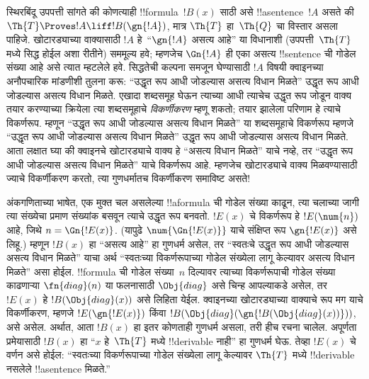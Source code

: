\documentclass[../../../include/open-logic-section]{subfiles}
\begin{document}


\begin{explain}
स्थिरबिंदू उपपत्ती सांगते की कोणत्याही
!!{formula}~$!B(x)$ साठी असे !!a{sentence}~$!A$ असते की
$\Th{T} \Proves !A \liff !B(\gn{!A})$, मात्र
$\Th{T}$ हा~$\Th{Q}$ चा विस्तार असला पाहिजे.
खोटारड्याच्या वाक्यासाठी $!A$ हे~“$\gn{!A}$ असत्य आहे”
या विधानाशी (उपपत्ती~$\Th{T}$ मध्ये सिद्ध होईल अशा
रीतीने) सममूल्य हवे; म्हणजेच $\Gn{!A}$ ही एका असत्य
!!{sentence} ची गोडेल संख्या आहे असे त्यात म्हटलेले हवे.
सिद्धतेची कल्पना समजून घेण्यासाठी $!A$ विषयी क्वाइनच्या
अनौपचारिक मांडणीशी तुलना करू: “उद्धृत रूप आधी जोडल्यास
असत्य विधान मिळते” उद्धृत रूप आधी जोडल्यास असत्य विधान
मिळते. एखादा शब्दसमूह घेऊन त्याच्या आधी त्याचेच उद्धृत
रूप जोडून वाक्य तयार करण्याच्या क्रियेला त्या शब्दसमूहाचे
\emph{विकर्णीकरण} म्हणू शकतो; तयार झालेला परिणाम हे
त्याचे विकर्णरूप. म्हणून “उद्धृत रूप आधी जोडल्यास असत्य
विधान मिळते” या शब्दसमूहाचे विकर्णरूप म्हणजे “उद्धृत रूप
आधी जोडल्यास असत्य विधान मिळते” उद्धृत रूप आधी
जोडल्यास असत्य विधान मिळते. आता लक्षात घ्या की क्वाइनचे
खोटारड्याचे वाक्य हे “असत्य विधान मिळते” याचे नव्हे,
तर “उद्धृत रूप आधी जोडल्यास असत्य विधान मिळते” याचे
विकर्णरूप आहे. म्हणजेच खोटारड्याचे वाक्य मिळवण्यासाठी
ज्याचे विकर्णीकरण करतो, त्या गुणधर्मातच विकर्णीकरण
समाविष्ट असते!{}

अंकगणिताच्या भाषेत, एक मुक्त चल असलेल्या
!!a{formula} ची गोडेल संख्या काढून, त्या चलाच्या जागी
त्या संख्येचा प्रमाण संख्यांक बसवून त्याचे उद्धृत रूप
बनवतो. $!E(x)$ चे विकर्णरूप हे $!E(\num{n})$ आहे,
जिथे $n = \Gn{!E(x)}$. (यापुढे
$\num{\Gn{!E(x)}}$ याचे संक्षिप्त रूप
$\gn{!E(x)}$ असे लिहू.) म्हणून $!B(x)$ हा
“असत्य आहे” हा गुणधर्म असेल, तर “स्वतःचे उद्धृत रूप
आधी जोडल्यास असत्य विधान मिळते” याचा अर्थ
“स्वतःच्या विकर्णरूपाच्या गोडेल संख्येला लागू केल्यावर
असत्य विधान मिळते” असा होईल. !!{formula} ची गोडेल
संख्या~$n$ दिल्यावर त्याच्या विकर्णरूपाची गोडेल संख्या
काढणाऱ्या $\fn{diag}(n)$ या फलनासाठी
$\Obj{diag}$ असे चिन्ह आपल्याकडे असेल, तर
$!E(x)$ हे $!B(\Obj{diag}(x))$ असे लिहिता येईल.
क्वाइनच्या खोटारड्याच्या वाक्याचे रूप मग याचे
विकर्णीकरण, म्हणजे $!E(\gn{!E(x)})$ किंवा
$!B(\Obj{diag}(\gn{!B(\Obj{diag}(x))}))$, असे असेल.
अर्थात, आता $!B(x)$ हा इतर कोणताही गुणधर्म असला,
तरी हीच रचना चालेल. अपूर्णता प्रमेयासाठी $!B(x)$
हा “$x$ हे~$\Th{T}$ मध्ये !!{derivable} नाही” हा
गुणधर्म घेऊ. तेव्हा $!E(x)$ चे वर्णन असे होईल:
“स्वतःच्या विकर्णरूपाच्या गोडेल संख्येला लागू केल्यावर
$\Th{T}$ मध्ये !!{derivable} नसलेले
!!a{sentence} मिळते.”


\end{explain}
\end{document}

